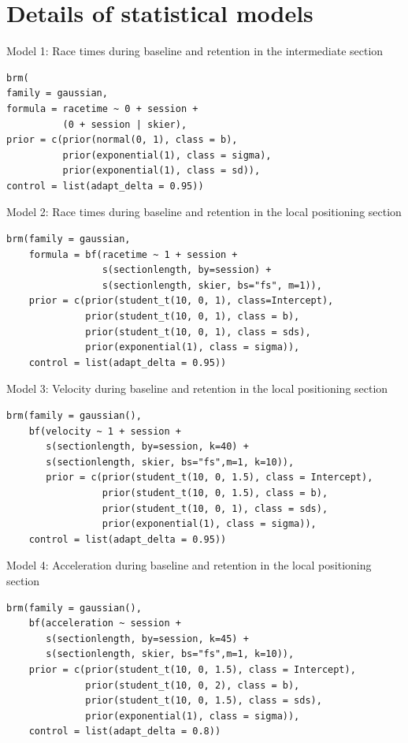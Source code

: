 \documentclass{article}
\begin{document}
\section{Details of statistical models}\label{appendixc}

Model 1: Race times during baseline and retention in the intermediate section

\begin{verbatim}
brm(
family = gaussian,
formula = racetime ~ 0 + session + 
          (0 + session | skier),
prior = c(prior(normal(0, 1), class = b),
          prior(exponential(1), class = sigma),
          prior(exponential(1), class = sd)),
control = list(adapt_delta = 0.95))
\end{verbatim}


Model 2: Race times during baseline and retention in the local positioning section

\begin{verbatim}
brm(family = gaussian,
    formula = bf(racetime ~ 1 + session + 
                 s(sectionlength, by=session) +
                 s(sectionlength, skier, bs="fs", m=1)),
    prior = c(prior(student_t(10, 0, 1), class=Intercept),
              prior(student_t(10, 0, 1), class = b),
              prior(student_t(10, 0, 1), class = sds),
              prior(exponential(1), class = sigma)),
    control = list(adapt_delta = 0.95))
\end{verbatim}

Model 3: Velocity during baseline and retention in the local positioning section

\begin{verbatim}
brm(family = gaussian(),
    bf(velocity ~ 1 + session + 
       s(sectionlength, by=session, k=40) +
       s(sectionlength, skier, bs="fs",m=1, k=10)), 
       prior = c(prior(student_t(10, 0, 1.5), class = Intercept),
                 prior(student_t(10, 0, 1.5), class = b),
                 prior(student_t(10, 0, 1), class = sds),
                 prior(exponential(1), class = sigma)),
    control = list(adapt_delta = 0.95))
\end{verbatim}

Model 4: Acceleration during baseline and retention in the local positioning section

\begin{verbatim}
brm(family = gaussian(),
    bf(acceleration ~ session + 
       s(sectionlength, by=session, k=45) +
       s(sectionlength, skier, bs="fs",m=1, k=10)), 
    prior = c(prior(student_t(10, 0, 1.5), class = Intercept),
              prior(student_t(10, 0, 2), class = b),
              prior(student_t(10, 0, 1.5), class = sds),
              prior(exponential(1), class = sigma)),
    control = list(adapt_delta = 0.8))
\end{verbatim}
\end{document}
